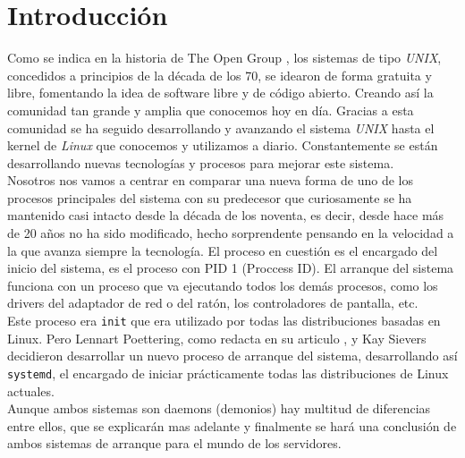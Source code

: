
\section{Introducción} %
Como se indica en la historia de The Open Group \cite{unix}, los sistemas de tipo \textit{UNIX}, concedidos a principios de la década de los 70, se idearon de forma gratuita y libre, fomentando la idea de software libre y de código abierto. Creando así la comunidad tan grande y amplia que conocemos hoy en día. Gracias a esta comunidad se ha seguido desarrollando y avanzando el sistema \textit{UNIX} hasta el kernel de \textit{Linux} que conocemos y utilizamos a diario. Constantemente se están desarrollando nuevas tecnologías y procesos para mejorar este sistema.\\

Nosotros nos vamos a centrar en comparar una nueva forma de uno de los procesos principales del sistema con su predecesor que curiosamente se ha mantenido casi intacto desde la década de los noventa, es decir, desde hace más de 20 años no ha sido modificado, hecho sorprendente pensando en la velocidad a la que avanza siempre la tecnología. El proceso en cuestión es el encargado del inicio del sistema, es el proceso con PID 1 (Proccess ID). El arranque del sistema funciona con un proceso que va ejecutando todos los demás procesos, como los drivers del adaptador de red o del ratón, los controladores de pantalla, etc.\\

Este proceso era \texttt{init} que era utilizado por todas las distribuciones basadas en Linux. Pero Lennart Poettering, como redacta en su articulo \cite{Lennart}, y Kay Sievers decidieron desarrollar un nuevo proceso de arranque del sistema, desarrollando así \texttt{systemd}, el encargado de iniciar prácticamente todas las distribuciones de Linux actuales.\\

Aunque ambos sistemas son daemons (demonios) hay multitud de diferencias entre ellos, que se explicarán mas adelante y finalmente se hará una conclusión de ambos sistemas de arranque para el mundo de los servidores.




